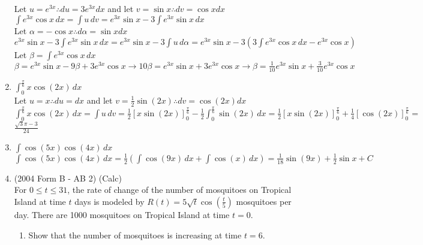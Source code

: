 \documentclass[10pt, letterpaper]{report}
\begin{document}
\begin{enumerate}
    Let $u=e^{3x}\therefore du=3e^{3x}dx$ and let $v=\sin{x}\therefore dv=\cos{x}dx$ \\
    
    $\int{e^{3x}\cos{x}}\,dx=
    \int{u}\,dv=
    e^{3x}\sin{x}-3\int{e^{3x}\sin{x}}\,dx$ \\
    
    Let $\alpha=-\cos{x}\therefore d\alpha=\sin{x}dx$ \\
    
    $e^{3x}\sin{x}-3\int{e^{3x}\sin{x}}\,dx=
    e^{3x}\sin{x}-3\int{u}\,d\alpha=
    e^{3x}\sin{x}-3\left(3\int{e^{3x}\cos{x}}\,dx-e^{3x}\cos{x}\right)$ \\
    
    Let $\beta=\int{e^{3x}\cos{x}}\,dx$ \\
    
    $\beta=e^{3x}\sin{x}-9\beta+3e^{3x}\cos{x}\rightarrow 
    10\beta=e^{3x}\sin{x}+3e^{3x}\cos{x}\rightarrow
    \beta=\frac{1}{10}e^{3x}\sin{x}+\frac{3}{10}e^{3x}\cos{x}$
    
  \item{$\int_{0}^{\frac{\pi}{6}}{x\cos{(2x)}}\,dx$} \\
  
    Let $u=x\therefore du=dx$ and let $v=\frac{1}{2}\sin{(2x)}\therefore dv=\cos{(2x)}dx$ \\
    
    $\int_{0}^{\frac{\pi}{6}}{x\cos{(2x)}}\,dx=
    \int{u}\,dv=
    \frac{1}{2}[x\sin{(2x)}]_{0}^{\frac{\pi}{6}}-\frac{1}{2}\int_{0}^{\frac{\pi}{6}}{\sin{(2x)}}\,dx=
    \frac{1}{2}[x\sin{(2x)}]_{0}^{\frac{\pi}{6}}+\frac{1}{4}[\cos{(2x)}]_{0}^{\frac{\pi}{6}}=$ \\ 
    
    $\frac{\sqrt{3}\pi-3}{24}$ \\
    
  \item{$\int{\cos{(5x)}\cos{(4x)}}\,dx$} \\
  
    $\int{\cos{(5x)}\cos{(4x)}}\,dx=
    \frac{1}{2}\left(\int{\cos{(9x)}}\,dx+\int{\cos{(x)}}\,dx\right)=
    \frac{1}{18}\sin{(9x)}+\frac{1}{2}\sin{x}+C$ \\
    
    \pagebreak
  \item{(2004 Form B - AB 2) (Calc) \\
        For $0\leq t\leq 31$, the rate of change of the number of mosquitoes on Tropical Island at time $t$ days is modeled by $R(t)=5\sqrt{t}\cos{\left(\frac{t}{5}\right)}$ mosquitoes per day. There are 1000 mosquitoes on Tropical Island at time $t=0$.}
    \begin{enumerate}
      \item{Show that the number of mosquitoes is increasing at time $t=6$.} \\
      

\end{enumerate}
\end{enumerate}
\end{document}
